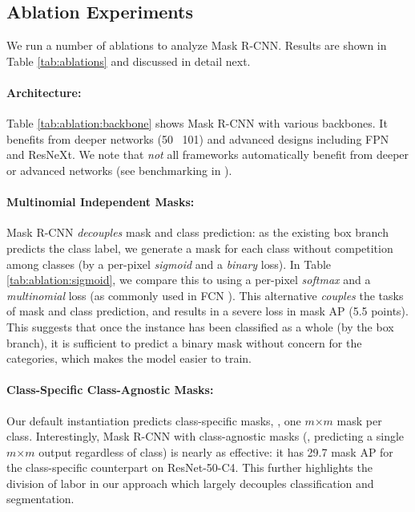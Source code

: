 \documentclass[10pt,twocolumn,letterpaper]{article}
\def\x{\times}
\begin{document}
\subsection{Ablation Experiments}\label{sec:ablations}

We run a number of ablations to analyze Mask R-CNN. Results are shown in Table \ref{tab:ablations} and discussed in detail next.

\paragraph{Architecture:} Table \ref{tab:ablation:backbone} shows Mask R-CNN with various backbones. It benefits from deeper networks (50 \vs~101) and advanced designs  including FPN and ResNeXt. We note that \emph{not} all frameworks automatically benefit from deeper or advanced networks (see benchmarking in \cite{Huang2017}).

\paragraph{Multinomial \vs Independent Masks:} Mask R-CNN \emph{decouples} mask and class prediction: as the existing box branch predicts the class label, we generate a mask for each class without competition among classes (by a per-pixel \emph{sigmoid} and a \emph{binary} loss). In Table \ref{tab:ablation:sigmoid}, we compare this to using a per-pixel \emph{softmax} and a \emph{multinomial} loss (as commonly used in FCN \cite{Long2015}). This alternative \emph{couples} the tasks of mask and class prediction, and results in a severe loss in mask AP (5.5 points). This suggests that once the instance has been classified as a whole (by the box branch), it is sufficient to predict a binary mask without concern for the categories, which makes the model easier to train.

\paragraph{Class-Specific \vs Class-Agnostic Masks:} Our default instantiation predicts class-specific masks, \ie, one $m$$\x$$m$ mask per class. Interestingly, Mask R-CNN with class-agnostic masks (\ie, predicting a single $m$$\x$$m$ output regardless of class) is nearly as effective: it has 29.7 mask AP  for the class-specific counterpart on ResNet-50-C4. This further highlights the division of labor in our approach which largely decouples classification and segmentation.
\end{document}
